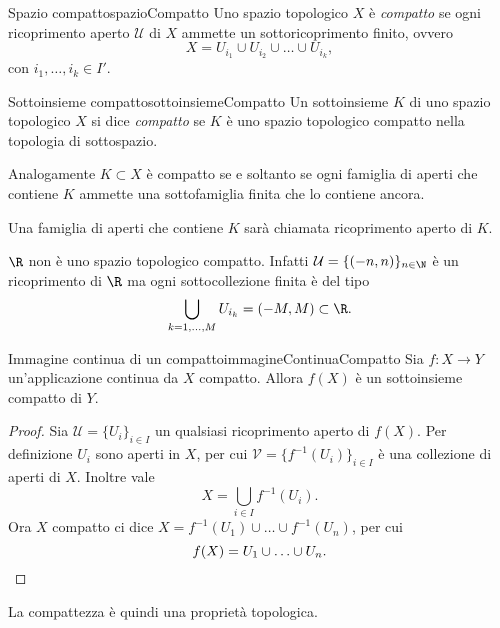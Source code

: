 \begin{defn}{Spazio compatto}{spazioCompatto}
	Uno spazio topologico \(X\) è \emph{compatto} se ogni ricoprimento aperto \(\mathcal{U}\) di \(X\) ammette un sottoricoprimento finito, ovvero
	\[
		X = U_{i_1} \cup U_{i_2} \cup \ldots \cup U_{i_k},
	\]
	con \(i_1,\ldots,i_k \in I'\).
\end{defn}

\begin{defn}{Sottoinsieme compatto}{sottoinsiemeCompatto}
	Un sottoinsieme \(K\) di uno spazio topologico \(X\) si dice \emph{compatto} se \(K\) è uno spazio topologico compatto nella topologia di sottospazio.
\end{defn}

\begin{oss}
	Analogamente \(K\subset X\) è compatto se e soltanto se ogni famiglia di aperti che contiene \(K\) ammette una sottofamiglia finita che lo contiene ancora.
\end{oss}

\begin{notz}
	Una famiglia di aperti che contiene \(K\) sarà chiamata ricoprimento aperto di \(K\).
\end{notz}

\begin{oss}
	\(\R\) non è uno spazio topologico compatto.
	Infatti \(\mathcal{U}=\{(-n,n)\}_{n\in \N}\) è un ricoprimento di \(\R\) ma ogni sottocollezione finita è del tipo
	\[
		\bigcup_{k=1,\ldots,M} U_{i_k} = (-M,M)\subset \R.
	\]
\end{oss}

\begin{prop}{Immagine continua di un compatto}{immagineContinuaCompatto}
	Sia \(f\colon X\to Y\) un'applicazione continua da \(X\) compatto.
	Allora \(f(X)\) è un sottoinsieme compatto di \(Y\).
\end{prop}

\begin{proof}
	Sia \(\mathcal{U}=\{U_i\}_{i\in I}\) un qualsiasi ricoprimento aperto di \(f(X)\).
	Per definizione \(U_i\) sono aperti in \(X\), per cui \(\mathcal{V}=\{f^{-1}(U_i)\}_{i\in I}\) è una collezione di aperti di \(X\).
	Inoltre vale
	\[
		X = \bigcup_{i\in I}f^{-1}(U_i).
	\]
	Ora \(X\) compatto ci dice \(X=f^{-1}(U_1)\cup \ldots \cup f^{-1}(U_n)\), per cui
	\[
		f(X) = U_1 \cup \ldots \cup U_n.\qedhere
	\]
\end{proof}

\begin{oss}
	La compattezza è quindi una proprietà topologica.
\end{oss}

